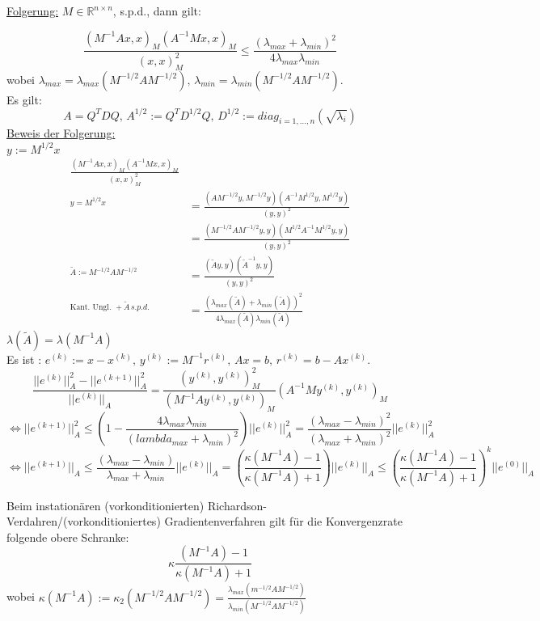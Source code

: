 \underline{Folgerung:} $M \in \mathbb{R}^{n \times n}$, s.p.d., dann gilt:

\[\frac{ (M^{-1}Ax,x)_M(A^{-1}Mx,x)_M}{(x,x)^2_M } \leq \frac{(\lambda_{max} + \lambda_{min})^2}{4\lambda_{max}\lambda_{min}} \]
wobei $\lambda_{max}=\lambda_{max}(M^{-1/2}AM^{-1/2}),\, \lambda_{min}=\lambda_{min}(M^{-1/2}AM^{-1/2})$.\\
Es gilt:
\[ A=Q^TDQ,\, A^{1/2}:=Q^TD^{1/2}Q,\, D^{1/2}:=diag_{i=1,\dots, n} ( \sqrt{\lambda_i}) \]
\underline{Beweis der Folgerung:}\\
$y:=M^{1/2}x$
\begin{align*}
\frac{(M^{-1}Ax,x)_M(A^{-1}Mx,x)_M}{(x,x)^2_M} \\
^{y=M^{1/2}x} &= \frac{ (AM^{-1/2}y,M^{-1/2}y)(A^{-1}M^{1/2}y,M^{1/2}y)}{(y,y)^2} \\
&= \frac{ (M^{-1/2}AM^{-1/2}y,y)(M^{1/2}A^{-1}M^{1/2}y,y)}{(y,y)^2} \\
^{\tilde A:=M^{-1/2}AM^{-1/2}} &= \frac{(\tilde A y ,y)(\tilde A^{-1}y,y)}{(y,y)^2} \\
^{\text{Kant. Ungl. } + \tilde A \, s.p.d.} &= \frac{(\lambda_{max}(\tilde A) + \lambda_{min}(\tilde A))^2}{4\lambda_{max}(\tilde A)\lambda_{min}(\tilde A)}
\end{align*}
$\lambda(\tilde A)=\lambda (M^{-1}A)$ \\
Es ist : $ e^{(k)}:= x-x^{(k)},\, y^{(k)}:= M^{-1}r^{(k)},\, Ax=b,\, r^{(k)}=b-Ax^{(k)}$.
\[ \frac{||e^{(k)}||^2_A - ||e^{(k+1)}||^2_A}{||e^{(k)}||_A} =\frac{(y^{(k)},y^{(k)})^2_M}{(M^{-1}Ay^{(k)},y^{(k)})_M}(A^{-1}My^{(k)},y^{(k)})_M \]
\[\Leftrightarrow ||e^{(k+1)}||^2_A \leq \left( 1-\frac{4\lambda_{max}\lambda_{min}}{(lambda_{max}+\lambda_{min})^2}\right) ||e^{(k)}||^2_A = \frac{(\lambda_{max}-\lambda_{min})^2}{(\lambda_{max}+\lambda_{min})^2} ||e^{(k)}||^2_A \]
\[ \Leftrightarrow || e^{(k+1)}||_A \leq \frac{(\lambda_{max} - \lambda_{min})}{\lambda_{max} + \lambda_{min}} ||e^{(k)}||_A = \left( \frac{\kappa (M^{-1}A) -1 }{\kappa (M^{-1}A)+1} \right) ||e^{(k)}||_A \leq \left( \frac{\kappa (M^{-1}A) -1 }{\kappa (M^{-1}A)+1} \right)^k ||e^{(0)}||_A \]

\begin{satz}
  Beim instationären (vorkonditionierten) Richardson-Verdahren/(vorkonditioniertes) Gradientenverfahren gilt für die Konvergenzrate folgende obere Schranke:
  \begin{equation}
    \kappa \frac{(M^{-1}A)-1}{\kappa(M^{-1}A)+1}
  \end{equation}
  wobei $\kappa(M^{-1}A):= \kappa_2(M^{-1/2}AM^{-1/2}) = \frac{\lambda_{max}(m^{-1/2}AM^{-1/2})}{\lambda_{min}(M^{-1/2}AM^{-1/2})}$
\end{satz}

